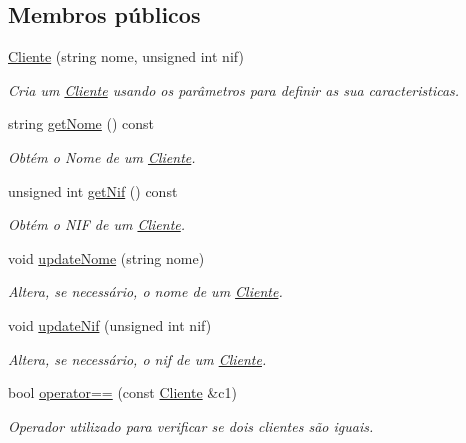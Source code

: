 \subsection*{Membros públicos}
\begin{DoxyCompactItemize}
\item 
\hyperlink{class_cliente_a32ef83e95c16d04dd21d3063dc741b2b}{Cliente} (string nome, unsigned int nif)
\begin{DoxyCompactList}\small\item\em Cria um \hyperlink{class_cliente}{Cliente} usando os parâmetros para definir as sua caracteristicas. \end{DoxyCompactList}\item 
string \hyperlink{class_cliente_a0325de899469e2fed48ffda2b5b291cf}{get\+Nome} () const 
\begin{DoxyCompactList}\small\item\em Obtém o Nome de um \hyperlink{class_cliente}{Cliente}. \end{DoxyCompactList}\item 
unsigned int \hyperlink{class_cliente_acdfcf2501116ef255f082fa8cbcf00f2}{get\+Nif} () const 
\begin{DoxyCompactList}\small\item\em Obtém o N\+I\+F de um \hyperlink{class_cliente}{Cliente}. \end{DoxyCompactList}\item 
void \hyperlink{class_cliente_a64bdc5ca23f1d781b5bb4d9bc42f773f}{update\+Nome} (string nome)
\begin{DoxyCompactList}\small\item\em Altera, se necessário, o nome de um \hyperlink{class_cliente}{Cliente}. \end{DoxyCompactList}\item 
void \hyperlink{class_cliente_a84df96f0f9cd1aa064fc80f98dc3ccbc}{update\+Nif} (unsigned int nif)
\begin{DoxyCompactList}\small\item\em Altera, se necessário, o nif de um \hyperlink{class_cliente}{Cliente}. \end{DoxyCompactList}\item 
bool \hyperlink{class_cliente_a5019f48eb9431f80045b3912734f36b3}{operator==} (const \hyperlink{class_cliente}{Cliente} \&c1)
\begin{DoxyCompactList}\small\item\em Operador utilizado para verificar se dois clientes são iguais. \end{DoxyCompactList}\end{DoxyCompactItemize}


